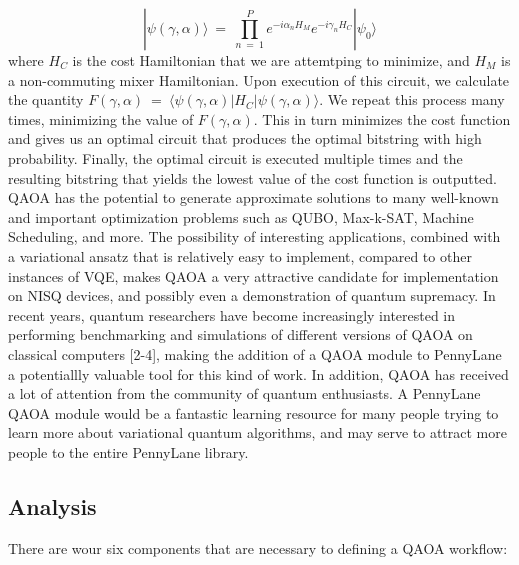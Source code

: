 \documentclass{article}
\begin{document}
$$|\psi(\gamma, \alpha)\rangle \ = \ \displaystyle\prod_{n \ = \ 1}^{P} e^{-i \alpha_n H_M} e^{-i \gamma_n H_C} |\psi_0\rangle$$
\noindent
where $H_C$ is the cost Hamiltonian that we are attemtping to minimize, and $H_M$ is a non-commuting mixer Hamiltonian.
\newline\newline
\noindent
Upon execution of this circuit, we calculate the quantity $F(\gamma, \alpha) \ = \ \langle \psi(\gamma, \alpha) | H_C | \psi (\gamma, \alpha) \rangle$.
We repeat this process many times, minimizing the value of $F(\gamma, \alpha)$.
This in turn minimizes the cost function and
gives us an optimal circuit that produces the optimal bitstring with high probability.
Finally, the optimal circuit is executed multiple times and the resulting bitstring that 
yields the lowest value of the cost function is outputted.
\newline\newline
\noindent
QAOA has the potential to generate approximate solutions to many well-known and important optimization problems 
such as QUBO, Max-k-SAT, Machine Scheduling, and more. The possibility of interesting applications, combined 
with a variational ansatz that is relatively easy to implement, compared to other instances of VQE, makes QAOA 
a very attractive candidate for implementation on NISQ devices, and possibly even a demonstration of quantum supremacy.
\newline\newline
\noindent 
In recent years, quantum researchers have become increasingly
interested in performing benchmarking and simulations of different versions of QAOA on classical computers [2-4], making the 
addition of a QAOA module to PennyLane a potentiallly valuable tool for this kind of work. In addition, QAOA has received a lot 
of attention from the community of quantum enthusiasts. A PennyLane QAOA module would be a fantastic learning resource
for many people trying to learn more about variational quantum algorithms, and may serve to attract more people to the entire PennyLane library.


\subsection{Analysis}

There are wour six components that are necessary to defining a QAOA workflow:
\end{document}
